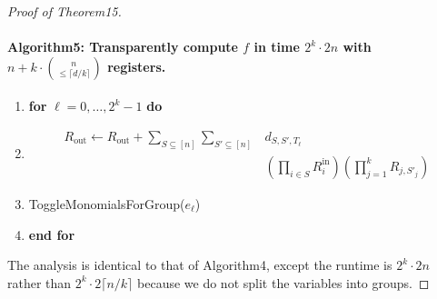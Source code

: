\documentclass[10pt,a4paper]{article}
\begin{document}
\begin{proof}[Proof of Theorem15]
\paragraph{Algorithm5: Transparently compute $f$ in time $2^k\cdot2n$ with $n+k\cdot\binom n{\leq\lceil d/k\rceil}$ registers.}
\begin{enumerate}[label=\arabic*:]
\item \textbf{for} $\ell=0,\ldots,2^k-1$ \textbf{do}
\item \[\begin{aligned}R_{\mathrm{out}}\leftarrow R_{\mathrm{out}}+\sum_{S\subseteq[n]}\sum_{S'\subseteq[n]}&d_{S,S',T_{\ell}}\\
&\mathord{}(\prod_{i\in S}R_i^{\mathrm{in}})(\prod_{j=1}^kR_{j,S'_j})\end{aligned}\]
\item ToggleMonomialsForGroup($e_{\ell}$)
\item \textbf{end for}
\end{enumerate}
The analysis is identical to that of Algorithm4, except the runtime is $2^k\cdot2n$ rather than $2^k\cdot2\lceil n/k\rceil$ because we do not split the variables into groups.
\end{proof}
\end{document}
